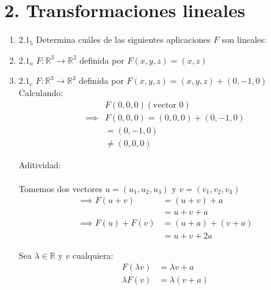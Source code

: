 \documentclass{article}
\begin{document}
		\section*{2. Transformaciones lineales}
		
		\begin{enumerate}
			
			\item[] \(2.1_5\) 
			Determina cuáles de las siguientes aplicaciones \(F\) son lineales:
			
			\item \(2.1_a\) 
			\(F: \mathbb{R}^3 \to \mathbb{R}^2\) definida por \(F(x,y,z)=(x,z)\)
			
			\item \(2.1_c\) 
			\(F: \mathbb{R}^3 \to \mathbb{R}^3\) definida por \(F(x,y,z)=(x,y,z)+(0,-1,0)\)\\
			
			Calculando:
			\begin{equation*}
				\begin{aligned}
					&F(0,0,0)  (\text{vector }0)\\
					\implies & F(0,0,0) =(0,0,0)+(0,-1,0)\\
					&\text{} = (0,-1,0)\\	
					&\text{} \neq (0,0,0)
				\end{aligned}
			\end{equation*}
			
			Aditividad:\\
			\\Tomemos dos vectores \(u=(u_1,u_2,u_3)\) y \(v=(v_1,v_2,v_3)\)
			\begin{equation*}
				\begin{aligned}
					\implies F(u+v) &=(u+v)+a\\
					&=u+v+a\\
					\implies F(u)+F(v) &=(u+a)+(v+a)\\
					&=u+v+2a
				\end{aligned}
			\end{equation*}
			
			Sea \(\lambda \in \mathbb{R}\) y \(v\) cualquiera: 
			\begin{equation*}
				\begin{aligned}
					F(\lambda v) &= \lambda v+a\\
					\lambda F(v) &= \lambda (v+a)
				\end{aligned}
			\end{equation*}
			

\end{enumerate}
\end{document}
